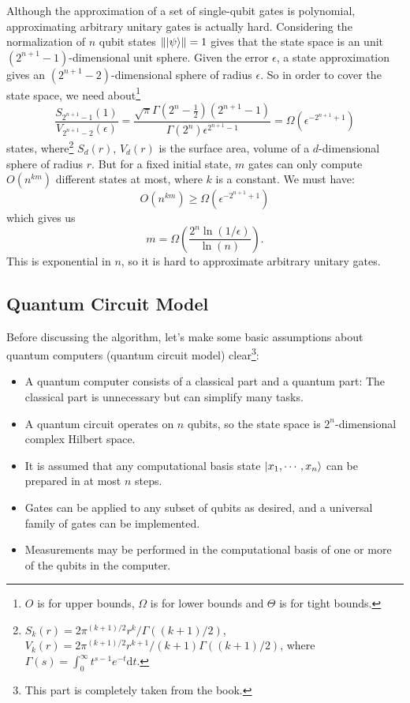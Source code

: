 \documentclass[a4paper,10pt]{article}
\numberwithin{equation}{subsection}
\begin{document}
\vspace{.5cm}
Although the approximation of a set of single-qubit gates is polynomial, approximating arbitrary unitary gates is actually hard. Considering the normalization of $n$ qubit states $\left\|\ket{\psi}\right\|=1$ gives that the state space is an unit $(2^{n+1}-1)$-dimensional unit sphere. Given the error $\epsilon$, a state approximation gives an $(2^{n+1}-2)$-dimensional sphere of radius $\epsilon$. So in order to cover the state space, we need about\footnote{$O$ is for upper bounds, $\Omega$ is for lower bounds and $\Theta$ is for tight bounds. }
\begin{equation}
    \frac{S_{2^{n+1}-1}(1)}{V_{2^{n+1}-2}(\epsilon)} = \frac{\sqrt{\pi}\Gamma(2^{n}-\frac{1}{2})(2^{n+1}-1)}{\Gamma(2^{n})\epsilon^{2^{n+1}-1}}=\Omega(\epsilon^{-2^{n+1}+1})
\end{equation}
states, where\footnote{$S_{k}(r)=2\pi^{(k+1)/2}r^{k}/\Gamma((k+1)/2)$, $V_{k}(r)=2\pi^{(k+1)/2}r^{k+1}/(k+1)\Gamma((k+1)/2)$, where $\Gamma(s)=\int_{0}^{\infty}t^{s-1}e^{-t}\mathrm{d}t$.} $S_{d}(r)$, $V_{d}(r)$ is the surface area, volume of a $d$-dimensional sphere of radius $r$. But for a fixed initial state, $m$ gates can only compute $O(n^{km})$ different states at most, where $k$ is a constant. We must have:
\begin{equation}
    O(n^{km})\geq\Omega(\epsilon^{-2^{n+1}+1})
\end{equation}
which gives us
\begin{equation}
    m = \Omega\left(\frac{2^{n}\ln(1/\epsilon)}{\ln(n)}\right).
\end{equation}
This is exponential in $n$, so it is hard to approximate arbitrary unitary gates.



\subsection{Quantum Circuit Model}

Before discussing the algorithm, let's make some basic assumptions about quantum computers (quantum circuit model) clear\footnote{This part is completely taken from the book\cite{nielsen2010}.}:
\begin{itemize}
    \item A quantum computer consists of a classical part and a quantum part: The classical part is unnecessary but can simplify many tasks.
    \item A quantum circuit operates on $n$ qubits, so the state space is $2^{n}$-dimensional complex Hilbert space.
    \item It is assumed that any computational basis state $\ket{x_{1},\cdots,x_{n}}$ can be prepared in at most $n$ steps.
    \item Gates can be applied to any subset of qubits as desired, and a universal family of gates can be implemented.
    \item Measurements may be performed in the computational basis of one or more of the qubits in the computer.
\end{itemize}
\end{document}
